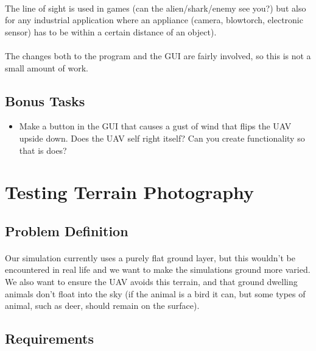 \documentclass[11pt]{book}
\begin{document}
\paragraph{} The line of sight is used in games (can the alien/shark/enemy see
you?) but also for any industrial application where an appliance (camera,
blowtorch, electronic sensor) has to be within a certain distance of an
object).

\paragraph{} The changes both to the program and the GUI are fairly involved,
so this is not a small amount of work.

\subsection{Bonus Tasks}

\begin{itemize}
\item Make a button in the GUI that causes a gust of wind that flips the UAV upside down. Does the UAV self right itself? Can you create functionality so that is does?
\end{itemize}

\clearpage

\section{Testing Terrain Photography}

\subsection{Problem Definition}

\paragraph{} Our simulation currently uses a purely flat ground layer, but
this wouldn't be encountered in real life and we want to make the simulations
ground more varied. We also want to ensure the UAV avoids this terrain, and
that ground dwelling animals don't float into the sky (if the animal is a bird
it can, but some types of animal, such as deer, should remain on the surface).

\subsection{Requirements}
\end{document}

